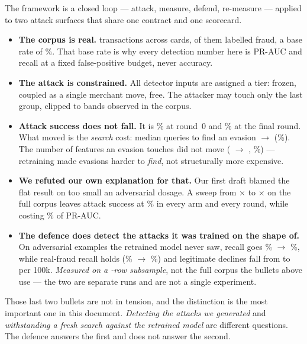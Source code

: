 \documentclass[11pt,a4paper]{article}
\begin{document}
The framework is a closed loop --- attack, measure, defend, re-measure --- applied to two
attack surfaces that share one contract and one scorecard.

\begin{itemize}
  \item \textbf{The corpus is real.} \CorpusRows{} transactions across \CorpusCards{} cards,
        \CorpusFraud{} of them labelled fraud, a base rate of \CorpusBaseRate\%. That base
        rate is why every detection number here is PR-AUC and recall at a fixed
        false-positive budget, never accuracy.
  \item \textbf{The attack is constrained.} All \NumFeatures{} detector inputs are assigned a
        tier: \NumFrozen{} frozen, \NumCoupled{} coupled as a single merchant move, \NumFree{}
        free. The attacker may touch only the last group, clipped to bands observed in the
        corpus.
  \item \textbf{Attack success does not fall.} It is \AsrFirst\% at round~0 and \AsrLast\% at
        the final round. What moved is the \emph{search} cost: median queries to find an
        evasion \QueriesFirst{} $\to$ \QueriesLast{} (\QueriesRise\%). The number of features
        an evasion touches did not move (\LzeroFirst{} $\to$ \LzeroLast{}, \LzeroRise\%) ---
        retraining made evasions harder to \emph{find}, not structurally more expensive.
  \item \textbf{We refuted our own explanation for that.} Our first draft blamed the flat
        result on too small an adversarial dosage. A sweep from \DosageMin$\times$ to
        \DosageMax$\times$ on the full corpus leaves attack success at \AsrLast\% in every
        arm and every round, while costing \DosagePrAucDrop\% of PR-AUC.
  \item \textbf{The defence does detect the attacks it was trained on the shape of.} On
        \AdvHoldoutN{} adversarial examples the retrained model never saw, recall goes
        \AdvHoldoutBefore\% $\to$ \AdvHoldoutAfter\%, while real-fraud recall holds
        (\AdvRealBefore\% $\to$ \AdvRealAfter\%) and legitimate declines fall from
        \AdvDeclinesBefore{} to \AdvDeclinesAfter{} per 100k. \emph{Measured on a
        \AdvRows-row subsample}, not the full corpus the bullets above use --- the two are
        separate runs and are not a single experiment.
\end{itemize}

\noindent
Those last two bullets are not in tension, and the distinction is the most important one in
this document. \emph{Detecting the attacks we generated} and \emph{withstanding a fresh
search against the retrained model} are different questions. The defence answers the first
and does not answer the second.
\end{document}
